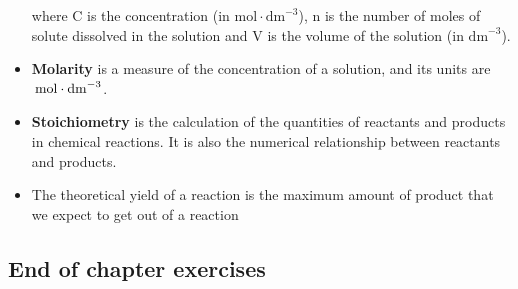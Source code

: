 \begin{itemize}[noitemsep]
where C is the concentration (in \begin{math}\mathrm{mol}\ensuremath{\cdot}{\mathrm{dm}}^{-3}\end{math}), n is the number of moles of solute dissolved in the solution and V is the volume of the solution (in \begin{math}{\mathrm{dm}}^{-3}\end{math}).
\label{m38712*uid119}\item \textbf{Molarity} is a measure of the concentration of a solution, and its units are \begin{math}\phantom{\rule{2pt}{0ex}}\mathrm{mol}\ensuremath{\cdot}{\mathrm{dm}}^{-3}\end{math}.
\label{m38712*uid120}\item \textbf{Stoichiometry} is the calculation of the quantities of reactants and products in chemical reactions. It is also the numerical relationship between reactants and products.
\item The theoretical yield of a reaction is the maximum amount of product that we expect to get out of a reaction\end{itemize}
        

\label{m38712*secfhsst!!!underscore!!!id2334}
            \subsection{ End of chapter exercises}
            \nopagebreak
            

